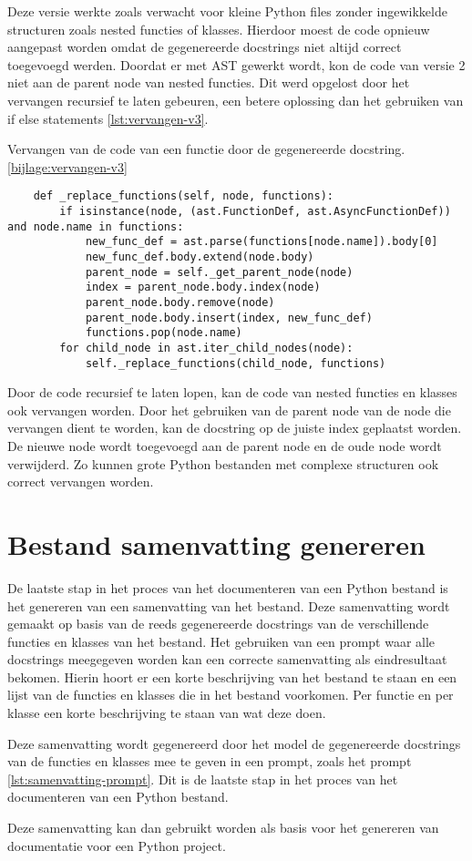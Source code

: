 Deze versie werkte zoals verwacht voor kleine Python files zonder ingewikkelde structuren zoals nested functies of klasses.
Hierdoor moest de code opnieuw aangepast worden omdat de gegenereerde docstrings niet altijd correct toegevoegd werden.
Doordat er met AST gewerkt wordt, kon de code van versie 2 niet aan de parent node van nested functies.
Dit werd opgelost door het vervangen recursief te laten gebeuren, een betere oplossing dan het gebruiken van if else statements \ref{lst:vervangen-v3}.

\begin{listing}
    \caption{Vervangen van de code van een functie door de gegenereerde docstring. \ref{bijlage:vervangen-v3}}
    \label{lst:vervangen-v3}
    \begin{verbatim}
    def _replace_functions(self, node, functions):
        if isinstance(node, (ast.FunctionDef, ast.AsyncFunctionDef)) and node.name in functions:
            new_func_def = ast.parse(functions[node.name]).body[0]
            new_func_def.body.extend(node.body)
            parent_node = self._get_parent_node(node)
            index = parent_node.body.index(node)
            parent_node.body.remove(node)
            parent_node.body.insert(index, new_func_def)
            functions.pop(node.name)
        for child_node in ast.iter_child_nodes(node):
            self._replace_functions(child_node, functions)
    \end{verbatim}
\end{listing}

Door de code recursief te laten lopen, kan de code van nested functies en klasses ook vervangen worden.
Door het gebruiken van de parent node van de node die vervangen dient te worden, kan de docstring op de juiste index geplaatst worden.
De nieuwe node wordt toegevoegd aan de parent node en de oude node wordt verwijderd.
Zo kunnen grote Python bestanden met complexe structuren ook correct vervangen worden.

\section{Bestand samenvatting genereren}
\label{sec:bestanddocumentatie-samenvatting}
De laatste stap in het proces van het documenteren van een Python bestand is het genereren van een samenvatting van het bestand.
Deze samenvatting wordt gemaakt op basis van de reeds gegenereerde docstrings van de verschillende functies en klasses van het bestand.
Het gebruiken van een prompt waar alle docstrings meegegeven worden kan een correcte samenvatting als eindresultaat bekomen.
Hierin hoort er een korte beschrijving van het bestand te staan en een lijst van de functies en klasses die in het bestand voorkomen.
Per functie en per klasse een korte beschrijving te staan van wat deze doen.

Deze samenvatting wordt gegenereerd door het model de gegenereerde docstrings van de functies en klasses mee te geven in een prompt, zoals het prompt \ref{lst:samenvatting-prompt}.
Dit is de laatste stap in het proces van het documenteren van een Python bestand.

Deze samenvatting kan dan gebruikt worden als basis voor het genereren van documentatie voor een Python project.